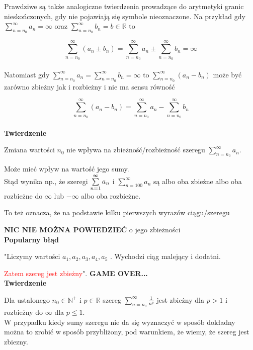 Prawdziwe są także analogiczne twierdzenia prowadzące do arytmetyki granic nieskończonych, gdy nie pojawiają się symbole nieoznaczone.
Na przykład gdy $ \sum\limits_{n = n_0}^{\infty} a_n = \infty $ oraz $ \sum\limits_{n = n_0}^{\infty} b_n = b \in \mathbb{R} $ to 

$$ \sum\limits_{n = n_0}^{\infty} (a_n \pm b_n) = \sum\limits_{n = n_0}^{\infty} a_n \pm \sum\limits_{n = n_0}^{\infty} b_n = \infty $$ \\

Natomiast gdy $ \sum\limits_{n = n_0}^{\infty} a_n = \sum\limits_{n = n_0}^{\infty} b_n = \infty $ to
$ \sum\limits_{n = n_0}^{\infty} (a_n - b_n) $ może być zarówno zbieżny jak i rozbieżny i nie ma sensu równość

$$ \sum\limits_{n = n_0}^{\infty} (a_n - b_n) = \sum\limits_{n = n_0}^{\infty} a_n - \sum\limits_{n = n_0}^{\infty} b_n $$ \\

\textbf{Twierdzenie}

Zmiana wartości $n_0$ nie wpływa na zbieżność/rozbieżność szeregu $ \sum\limits_{n = n_0}^{\infty} a_n $.

Może mieć wpływ na wartość jego sumy. \\

Stąd wynika np., że szeregi $ \sum\limits_{n = 1}^{\infty} a_n $ i $ \sum\limits_{n = 100}^{\infty} a_n $ są albo oba zbieżne
albo oba rozbieżne do $ \infty $ lub $-\infty$ albo oba rozbieżne.

To też oznacza, że na podstawie kilku pierwszych wyrazów ciągu/szeregu

\textbf{NIC NIE MOŻNA POWIEDZIEĆ} o jego zbieżności \\

\textbf{Popularny błąd}

"Liczymy wartości $ a_1, a_2, a_3, a_4, a_5$ . Wychodzi ciąg malejący i dodatni.

\textcolor{red}{Zatem szereg jest zbieżny}". \textbf{GAME OVER...} \\

\textbf{Twierdzenie}

Dla ustalonego $ n_0 \in \mathbb{N}^+ $ i $ p \in \mathbb{R} $ szereg $ \sum\limits_{n = n_0}^{\infty} \frac{1}{n^p} $
jest zbieżny dla $ p > 1 $ i rozbieżny do $\infty$ dla $p \leq 1$.  \\

W przypadku kiedy sumy szeregu nie da się wyznaczyć w sposób dokładny można to zrobić w sposób przybliżony, pod warunkiem, że wiemy,
że szereg jest zbiezny. \\

